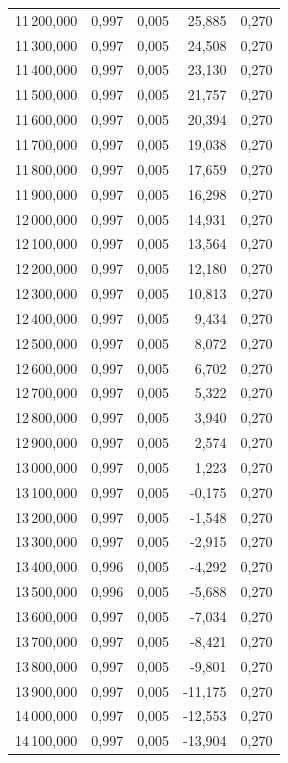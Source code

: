 \begin{longtable}{rrrrr}
11\,200,000 & 0,997 & 0,005 & 25,885 & 0,270\\
11\,300,000 & 0,997 & 0,005 & 24,508 & 0,270\\
11\,400,000 & 0,997 & 0,005 & 23,130 & 0,270\\
11\,500,000 & 0,997 & 0,005 & 21,757 & 0,270\\
11\,600,000 & 0,997 & 0,005 & 20,394 & 0,270\\
11\,700,000 & 0,997 & 0,005 & 19,038 & 0,270\\
11\,800,000 & 0,997 & 0,005 & 17,659 & 0,270\\
11\,900,000 & 0,997 & 0,005 & 16,298 & 0,270\\
12\,000,000 & 0,997 & 0,005 & 14,931 & 0,270\\
12\,100,000 & 0,997 & 0,005 & 13,564 & 0,270\\
12\,200,000 & 0,997 & 0,005 & 12,180 & 0,270\\
12\,300,000 & 0,997 & 0,005 & 10,813 & 0,270\\
12\,400,000 & 0,997 & 0,005 & 9,434 & 0,270\\
12\,500,000 & 0,997 & 0,005 & 8,072 & 0,270\\
12\,600,000 & 0,997 & 0,005 & 6,702 & 0,270\\
12\,700,000 & 0,997 & 0,005 & 5,322 & 0,270\\
12\,800,000 & 0,997 & 0,005 & 3,940 & 0,270\\
12\,900,000 & 0,997 & 0,005 & 2,574 & 0,270\\
13\,000,000 & 0,997 & 0,005 & 1,223 & 0,270\\
13\,100,000 & 0,997 & 0,005 & -0,175 & 0,270\\
13\,200,000 & 0,997 & 0,005 & -1,548 & 0,270\\
13\,300,000 & 0,997 & 0,005 & -2,915 & 0,270\\
13\,400,000 & 0,996 & 0,005 & -4,292 & 0,270\\
13\,500,000 & 0,996 & 0,005 & -5,688 & 0,270\\
13\,600,000 & 0,997 & 0,005 & -7,034 & 0,270\\
13\,700,000 & 0,997 & 0,005 & -8,421 & 0,270\\
13\,800,000 & 0,997 & 0,005 & -9,801 & 0,270\\
13\,900,000 & 0,997 & 0,005 & -11,175 & 0,270\\
14\,000,000 & 0,997 & 0,005 & -12,553 & 0,270\\
14\,100,000 & 0,997 & 0,005 & -13,904 & 0,270\\

\end{longtable}
